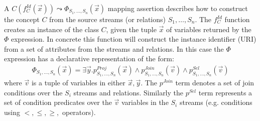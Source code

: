 A $C(f_C^{Id}(\vec{x})) \leadsto \Phi_{S_1,\ldots,S_n}(\vec{x})$ mapping assertion describes how to construct the concept $C$ from the source streams (or relations) $S_1,\ldots,S_n$. The $f_C^{Id}$ function creates an instance of the class $C$, given the tuple $\vec{x}$ of variables returned by the $\Phi$ expression. In concrete this function will construct the instance identifier (URI) from a set of attributes from the streams and relations.
In this case the $\Phi$ expression has a declarative representation of the form:
\begin{align*}
\Phi_{S_1,\ldots,S_n}(\vec{x})=\exists\vec{y}.p^{Proj}_{S_1,\ldots,S_n}(\vec{x}) \wedge p^{Join}_{S_1,\ldots,S_n}(\vec{v}) \wedge p_{S_1,\ldots,S_n}^{Sel}(\vec{v})
\end{align*}
where $\vec{v}$ is a tuple of variables in either $\vec{x},\vec{y}$. The $p^{Join}$ term denotes a set of join conditions over the $S_i$ streams and relations. Similarly the $p^{Sel}$ term represents a set of condition predicates over the $\vec{v}$ variables in the $S_i$ streams (e.g. conditions using $<,\leq,\geq,$ operators).
\\
%

